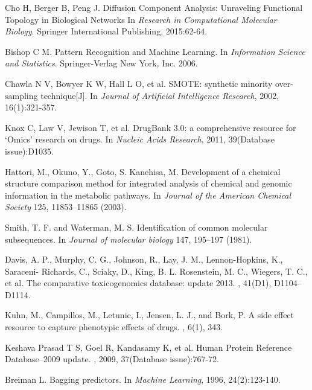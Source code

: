 \documentclass[journal]{IEEEtran}
\begin{document}
\begin{thebibliography}{10}
Cho H, Berger B, Peng J. 
\newblock Diffusion Component Analysis: Unraveling Functional Topology in Biological Networks
\newblock In {\em Research in Computational Molecular Biology}. Springer International Publishing, 2015:62-64.



Bishop C M. 
\newblock Pattern Recognition and Machine Learning. 
\newblock In {\em Information Science and Statistics}. Springer-Verlag New York, Inc. 2006.

Chawla N V, Bowyer K W, Hall L O, et al. \newblock SMOTE: synthetic minority over-sampling technique[J].
\newblock In {\em Journal of Artificial Intelligence Research}, 2002, 16(1):321-357.

Knox C, Law V, Jewison T, et al. 
\newblock DrugBank 3.0: a comprehensive resource for ‘Omics’ research on drugs. 
\newblock In {\em Nucleic Acids Research}, 2011, 39(Database issue):D1035.

Hattori, M., Okuno, Y., Goto, S.  Kanehisa, M.
\newblock Development of a chemical structure comparison method for integrated analysis of chemical and genomic information in the metabolic pathways. 
\newblock In {\em Journal of the American Chemical Society} 125, 11853–11865 (2003).


Smith, T. F. and Waterman, M. S. 
\newblock Identification of common molecular subsequences. 
\newblock In {\em Journal of molecular biology} 147, 195–197 (1981).


Davis, A. P., Murphy, C. G., Johnson, R., Lay, J. M., Lennon-Hopkins, K., Saraceni- Richards, C., Sciaky, D., King, B. L. Rosenstein, M. C., Wiegers, T. C., et al. 
\newblock The comparative toxicogenomics database: update 2013.
, 41(D1), D1104–D1114.


Kuhn, M., Campillos, M., Letunic, I., Jensen, L. J., and Bork, P.  
\newblock A side effect resource to capture phenotypic effects of drugs. 
, 6(1), 343.

Keshava Prasad T S, Goel R, Kandasamy K, et al. 
\newblock Human Protein Reference Database--2009 update.
, 2009, 37(Database issue):767-72.


Breiman L. 
\newblock Bagging predictors. 
\newblock In {\em Machine Learning}, 1996, 24(2):123-140.

\end{thebibliography}
\end{document}
